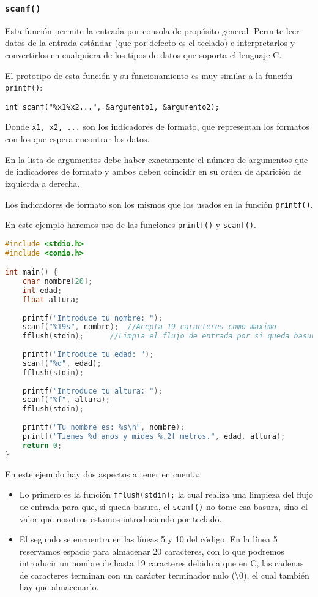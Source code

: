 \subsubsection{\texttt{scanf()}}{
Esta función permite la entrada por consola de propósito general. Permite leer datos de la entrada estándar (que por defecto es el teclado) e interpretarlos y convertirlos en cualquiera de los tipos de datos que soporta el lenguaje C.

El prototipo de esta función y su funcionamiento es muy similar a la función \texttt{printf()}:

\texttt{int scanf("\%x1\%x2...", \&argumento1, \&argumento2);}

Donde \texttt{x1, x2, ...} son los indicadores de formato, que representan los formatos con los que espera encontrar los datos.

En la lista de argumentos debe haber exactamente el número de argumentos que de indicadores de formato y ambos deben coincidir en su orden de aparición de izquierda a derecha.

Los indicadores de formato son los mismos que los usados en la función \texttt{printf()}.
\begin{Ejemplo}
En este ejemplo haremos uso de las funciones \texttt{printf()} y \texttt{scanf()}.
\begin{lstlisting}[language=C]
#include <stdio.h>
#include <conio.h>

int main() {
    char nombre[20];
    int edad;
    float altura;
    
    printf("Introduce tu nombre: ");
    scanf("%19s", nombre);	//Acepta 19 caracteres como maximo
    fflush(stdin);		//Limpia el flujo de entrada por si queda basura
    
    printf("Introduce tu edad: ");
    scanf("%d", edad);
    fflush(stdin);
    
    printf("Introduce tu altura: ");
    scanf("%f", altura);
    fflush(stdin);
    
    printf("Tu nombre es: %s\n", nombre);
    printf("Tienes %d anos y mides %.2f metros.", edad, altura);
    return 0;
}
\end{lstlisting}
\Explicacion
En este ejemplo hay dos aspectos a tener en cuenta:
\begin{itemize}
	\item Lo primero es la función \texttt{fflush(stdin);} la cual realiza una limpieza del flujo de entrada para que, si queda basura, el \texttt{scanf()} no tome esa basura, sino el valor que nosotros estamos introduciendo por teclado.
	\item El segundo se encuentra en las líneas 5 y 10 del código. En la línea 5 reservamos espacio para almacenar 20 caracteres, con lo que podremos introducir un nombre de hasta 19 caracteres debido a que en C, las cadenas de caracteres terminan con un carácter terminador nulo (\textbackslash0), el cual también hay que almacenarlo.
\end{itemize}
\end{Ejemplo}
}

